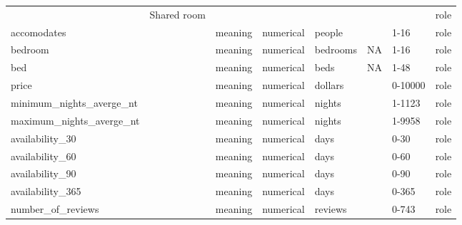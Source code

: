 \begin{center}
\begin{xltabular}{\textwidth}{llXlllll}
                            & Shared room                 &                                   &             &                &                             &                     & role \\
accomodates                 &                             & meaning                           & numerical   & people         &                             &                     1-16    & role \\
bedroom                     &                             & meaning                           & numerical   & bedrooms       & NA                          &                     1-16    & role \\
bed                         &                             & meaning                           & numerical   & beds           & NA                          &                     1-48    & role \\
price                       &                             & meaning                           & numerical   & dollars        &                             &                     0-10000 & role \\
minimum\_nights\_averge\_nt &                             & meaning                           & numerical   & nights         &                             &                     1-1123  & role \\
maximum\_nights\_averge\_nt &                             & meaning                           & numerical   & nights         &                             &                     1-9958  & role \\
availability\_30            &                             & meaning                           & numerical   & days           &                             &                     0-30    & role \\
availability\_60            &                             & meaning                           & numerical   & days           &                             &                     0-60    & role \\
availability\_90            &                             & meaning                           & numerical   & days           &                             &                     0-90    & role \\
availability\_365           &                             & meaning                           & numerical   & days           &                             &                     0-365   & role \\
number\_of\_reviews         &                             & meaning                           & numerical   & reviews        &                             &                     0-743   & role \\

\end{xltabular}
\end{center}
